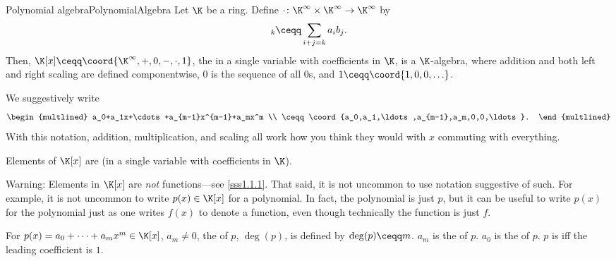 \begin{prp}{Polynomial algebra}{PolynomialAlgebra}
	Let $\K$ be a ring.  Define $\cdot \colon \K ^{\infty}\times \K ^{\infty}\rightarrow \K ^{\infty}$ by
	\begin{equation}
		[a\cdot b]_k\ceqq \sum _{i+j=k}a_ib_j.
	\end{equation}
	Then, $\K [x]\ceqq \coord{\K ^{\infty},+,0,-,\cdot ,1}$, the  in a single variable with coefficients in $\K$, is a $\K$-algebra, where addition and both left and right scaling are defined componentwise, $0$ is the sequence of all $0$s, and $1\ceqq \coord{1,0,0,\ldots }$.
	\begin{rmk}
		We suggestively write
		\begin{equation}
			\begin{multlined}
				a_0+a_1x+\cdots +a_{m-1}x^{m-1}+a_mx^m \\ \ceqq \coord{a_0,a_1,\ldots ,a_{m-1},a_m,0,0,\ldots }.
			\end{multlined}
		\end{equation}
		With this notation, addition, multiplication, and scaling all work how you think they would with $x$ commuting with everything.
	\end{rmk}
	\begin{rmk}
		Elements of $\K [x]$ are  (in a single variable with coefficients in $\K$).
	\end{rmk}
	\begin{rmk}
		Warning:  Elements in $\K [x]$ are \emph{not} functions---see \cref{sss1.1.1}.  That said, it is not uncommon to use notation suggestive of such.  For example, it is not uncommon to write $p(x)\in \K [x]$ for a polynomial.  In fact, the polynomial is just $p$, but it can be useful to write $p(x)$ for the polynomial just as one writes $f(x)$ to denote a function, even though technically the function is just $f$.
	\end{rmk}
	\begin{rmk}
		For $p(x)=a_0+\cdots +a_mx^m\in \K [x]$, $a_m\neq 0$, the  of $p$, $\deg (p)$, is defined by $\deg (p)\ceqq m$.   $a_m$ is the  of $p$.  $a_0$ is the  of $p$.  $p$ is  iff the leading coefficient is $1$.
	\end{rmk}
	\begin{rmk}

\end{rmk}
\end{prp}
